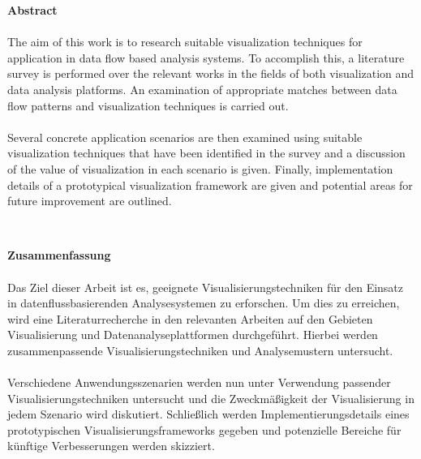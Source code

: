 \begin{center}
\textbf{Abstract}
\end{center}

\paragraph{}
The aim of this work is to research suitable visualization techniques for application in data flow based analysis systems. To accomplish this, a literature survey is performed over the relevant works in the fields of both visualization and data analysis platforms. An examination of appropriate matches between data flow patterns and visualization techniques is carried out.

\paragraph{}
Several concrete application scenarios are then examined using suitable visualization techniques that have been identified in the survey and a discussion of the value of visualization in each scenario is given. Finally, implementation details of a prototypical visualization framework are given and potential areas for future improvement are outlined.

\ \\

\begin{center}
\textbf{Zusammenfassung}
\end{center}

\paragraph{}
Das Ziel dieser Arbeit ist es, geeignete Visualisierungstechniken für den Einsatz in datenflussbasierenden Analysesystemen zu erforschen. Um dies zu erreichen, wird eine Literaturrecherche in den relevanten Arbeiten auf den Gebieten Visualisierung und Datenanalyseplattformen durchgeführt. Hierbei werden zusammenpassende Visualisierungstechniken und Analysemustern untersucht.




\paragraph{}
Verschiedene Anwendungsszenarien werden nun unter Verwendung passender Visualisierungstechniken untersucht und die Zweckmäßigkeit der Visualisierung in jedem Szenario wird diskutiert. Schließlich werden Implementierungsdetails eines prototypischen Visualisierungsframeworks gegeben und potenzielle Bereiche für künftige Verbesserungen werden skizziert.

\bigskip
